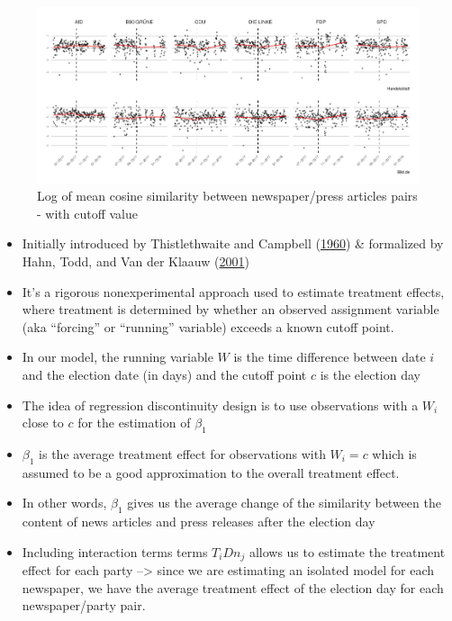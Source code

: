 \documentclass[
]{article}
\providecommand{\tightlist}{%
  \setlength{\itemsep}{0pt}\setlength{\parskip}{0pt}}
\begin{document}
\begin{figure}

{\centering \includegraphics[width=0.8\linewidth]{main_text_files/figure-latex/Daily mean cosine similarity - rd example-1} 

}

\caption{Log of mean cosine similarity between newspaper/press articles pairs - with cutoff value \label{fig:mean_cosine_sim_rd_example}}\label{fig:Daily mean cosine similarity - rd example}
\end{figure}

\begin{itemize}
\tightlist
\item
  Initially introduced by Thistlethwaite and Campbell
  (\protect\hyperlink{ref-thistlethwaite_regression-discontinuity_1960}{1960})
  \& formalized by Hahn, Todd, and Van der Klaauw
  (\protect\hyperlink{ref-hahn_identification_2001}{2001})
\item
  It's a rigorous nonexperimental approach used to estimate treatment
  effects, where treatment is determined by whether an observed
  assignment variable (aka ``forcing'' or ``running'' variable) exceeds
  a known cutoff point.
\item
  In our model, the running variable \(W\) is the time difference
  between date \(i\) and the election date (in days) and the cutoff
  point \(c\) is the election day
\item
  The idea of regression discontinuity design is to use observations
  with a \(W_i\) close to \(c\) for the estimation of \(\beta_1\)
\item
  \(\beta_1\) is the average treatment effect for observations with
  \(W_i = c\) which is assumed to be a good approximation to the overall
  treatment effect.
\item
  In other words, \(\beta_1\) gives us the average change of the
  similarity between the content of news articles and press releases
  after the election day
\item
  Including interaction terms terms \(T_iDn_{j}\) allows us to estimate
  the treatment effect for each party --\textgreater{} since we are
  estimating an isolated model for each newspaper, we have the average
  treatment effect of the election day for each newspaper/party pair.
\end{itemize}
\end{document}
